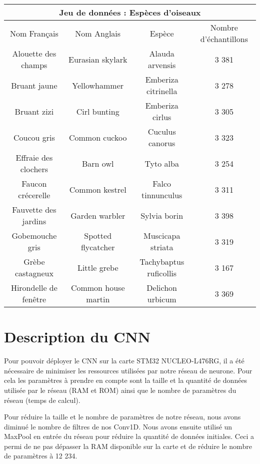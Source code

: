 \begin{center}
  \begin{tabular}{ |c|c|c|c| }
   \hline
   \multicolumn{4}{|c|}{Jeu de données : Espèces d'oiseaux} \\
   \hline
    Nom Français & Nom Anglais & Espèce & Nombre d'échantillons\\
   \hline
    Alouette des champs & Eurasian skylark & Alauda arvensis & 3 381\\
    Bruant jaune & Yellowhammer & Emberiza citrinella & 3 278\\
    Bruant zizi & Cirl bunting & Emberiza cirlus & 3 305\\
    Coucou gris & Common cuckoo & Cuculus canorus & 3 323\\
    Effraie des clochers & Barn owl & Tyto alba & 3 254\\
    Faucon crécerelle & Common kestrel & Falco tinnunculus & 3 311\\
    Fauvette des jardins & Garden warbler & Sylvia borin & 3 398\\
    Gobemouche gris & Spotted flycatcher & Muscicapa striata & 3 319\\
    Grèbe castagneux & Little grebe & Tachybaptus ruficollis & 3 167\\
    Hirondelle de fenêtre & Common house martin & Delichon urbicum & 3 369\\
   \hline
  \end{tabular}
\end{center}

\section{Description du CNN}

Pour pouvoir déployer le CNN sur la carte STM32 NUCLEO-L476RG, il a été nécessaire 
de minimiser les ressources utilisées par notre réseau de neurone. Pour cela les paramètres à prendre en compte sont
la taille et la quantité de données utilisée par le réseau (RAM et ROM) ainsi que le nombre 
de paramètres du réseau (temps de calcul).

Pour réduire la taille et le nombre de paramètres de notre réseau, nous avons diminué le nombre de filtres de nos
Conv1D. Nous avons ensuite utilisé un MaxPool en entrée du réseau pour réduire la quantité de données initiales. 
Ceci a permi de ne pas dépasser la RAM disponible sur la carte et de réduire le nombre de paramètres à 12 234.

